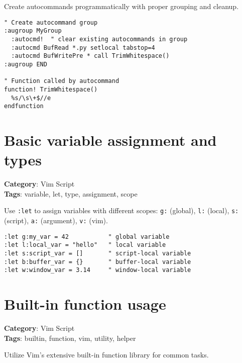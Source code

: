 {{{{{{{{{{{{{{{{{{Create autocommands programmatically with proper grouping and cleanup.

\begin{Exa*}{}
\begin{Verbatim}[fontsize=\footnotesize, breaklines, breakanywhere]
" Create autocommand group
:augroup MyGroup
  :autocmd!  " clear existing autocommands in group
  :autocmd BufRead *.py setlocal tabstop=4
  :autocmd BufWritePre * call TrimWhitespace()
:augroup END

" Function called by autocommand
function! TrimWhitespace()
  %s/\s\+$//e
endfunction
\end{Verbatim}
\end{Exa*}

\section{Basic variable assignment and types}

\textbf{Category}: Vim Script\\ \textbf{Tags}: variable, let, type, assignment, scope
\vspace{0.5cm}

Use {\footnotesize \Verb§:let§} to assign variables with different scopes: {\footnotesize \Verb§g:§} (global), {\footnotesize \Verb§l:§} (local), {\footnotesize \Verb§s:§} (script), {\footnotesize \Verb§a:§} (argument), {\footnotesize \Verb§v:§} (vim).

\begin{Exa*}{}
\begin{Verbatim}[fontsize=\footnotesize, breaklines, breakanywhere]
:let g:my_var = 42           " global variable
:let l:local_var = "hello"   " local variable
:let s:script_var = []       " script-local variable
:let b:buffer_var = {}       " buffer-local variable
:let w:window_var = 3.14     " window-local variable
\end{Verbatim}
\end{Exa*}

\section{Built-in function usage}

\textbf{Category}: Vim Script\\ \textbf{Tags}: builtin, function, vim, utility, helper
\vspace{0.5cm}

Utilize Vim's extensive built-in function library for common tasks.

}}}}}}}}}}}}}}}}}}

